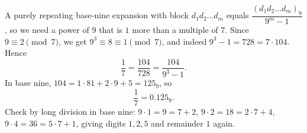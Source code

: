A purely repeating base-nine expansion with block $d_1d_2\dots d_m$ equals $\dfrac{(d_1d_2\dots d_m)_9}{9^m-1}$, so we need a power of $9$ that is $1$ more than a multiple of $7$. Since $9\equiv2\pmod 7$, we get $9^3\equiv8\equiv1\pmod7$, and indeed $9^3-1=728=7\cdot104$. Hence
\[
\dfrac{1}{7}=\dfrac{104}{728}=\dfrac{104}{9^3-1}.
\]
In base nine, $104=1\cdot81+2\cdot9+5=125_9$, so
\[
\dfrac{1}{7}=\boxed{0.\overline{125}_9}.
\]
Check by long division in base nine: $9\cdot1=9=7+2$, $9\cdot2=18=2\cdot7+4$, $9\cdot4=36=5\cdot7+1$, giving digits $1,2,5$ and remainder $1$ again.
